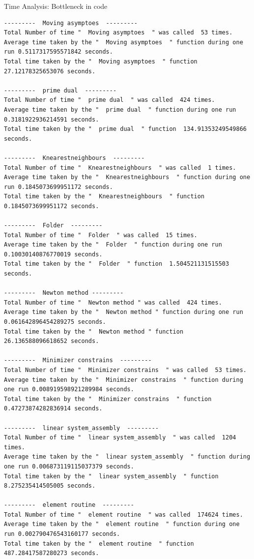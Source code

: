 \documentclass[a4paper,12pt,times]{article}
\begin{document}
\begin{section}{Time Analysis: Bottleneck in code}
\begin{lstlisting}
---------  Moving asymptoes  ---------
Total Number of time "  Moving asymptoes  " was called  53 times.
Average time taken by the "  Moving asymptoes  " function during one run 0.5117317595571842 seconds.
Total time taken by the "  Moving asymptoes  " function  27.12178325653076 seconds. 

---------  prime dual  ---------
Total Number of time "  prime dual  " was called  424 times.
Average time taken by the "  prime dual  " function during one run 0.3181922936214591 seconds.
Total time taken by the "  prime dual  " function  134.91353249549866 seconds. 

---------  Knearestneighbours  ---------
Total Number of time "  Knearestneighbours  " was called  1 times.
Average time taken by the "  Knearestneighbours  " function during one run 0.1845073699951172 seconds.
Total time taken by the "  Knearestneighbours  " function  0.1845073699951172 seconds. 

---------  Folder  ---------
Total Number of time "  Folder  " was called  15 times.
Average time taken by the "  Folder  " function during one run 0.10030140876770019 seconds.
Total time taken by the "  Folder  " function  1.504521131515503 seconds. 

---------  Newton method ---------
Total Number of time "  Newton method " was called  424 times.
Average time taken by the "  Newton method " function during one run 0.061642896454289275 seconds.
Total time taken by the "  Newton method " function  26.136588096618652 seconds. 

---------  Minimizer constrains  ---------
Total Number of time "  Minimizer constrains  " was called  53 times.
Average time taken by the "  Minimizer constrains  " function during one run 0.008919598921289984 seconds.
Total time taken by the "  Minimizer constrains  " function  0.47273874282836914 seconds. 

---------  linear system_assembly  ---------
Total Number of time "  linear system_assembly  " was called  1204 times.
Average time taken by the "  linear system_assembly  " function during one run 0.006873119115037379 seconds.
Total time taken by the "  linear system_assembly  " function  8.275235414505005 seconds. 

---------  element routine  ---------
Total Number of time "  element routine  " was called  174624 times.
Average time taken by the "  element routine  " function during one run 0.002790476543160177 seconds.
Total time taken by the "  element routine  " function  487.28417587280273 seconds. 


\end{lstlisting}
\end{section}
\end{document}
